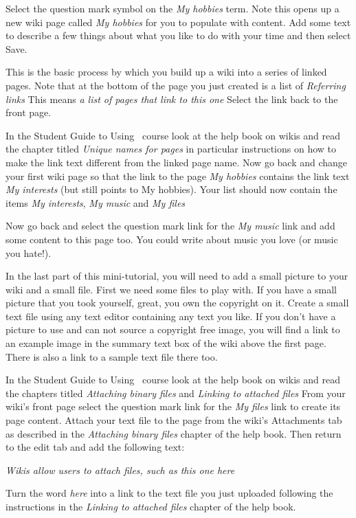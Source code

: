 Select the question mark symbol on the \emph{My hobbies} term. Note this opens up a new wiki page called \emph{My hobbies} for you to populate with content. Add some text to describe a few things about what you like to do with your time and then select Save.

This is the basic process by which you build up a wiki into a series of linked pages. Note that at the bottom of the page you just created is a list of \emph{Referring links}  This means \emph{a list of pages that link to this one}  Select the link back to the front page.

In the Student Guide to Using \moodle\ course look at the help book on wikis and read the chapter titled \emph{Unique names for pages}  in particular instructions on how to make the link text different from the linked page name. Now go back and change your first wiki page so that the link to the page \emph{My hobbies} contains the link text \emph{My interests} (but still points to My hobbies). Your list should now contain the items \emph{My interests},  \emph{My music}  and \emph{My files} 

Now go back and select the question mark link for the \emph{My music} link and add some content to this page too. You could write about music you love (or music you hate!).

In the last part of this mini-tutorial, you will need to add a small picture to your wiki and a small file. First we need some files to play with. If you have a small picture that you took yourself, great, you own the copyright on it. Create a small text file using any text editor containing any text you like. If you don't have a picture to use and can not source a copyright free image, you will find a link to an example image in the summary text box of the wiki above the first page. There is also a link to a sample text file there too.

In the Student Guide to Using \moodle\ course look at the help book on wikis and read the chapters titled \emph{Attaching binary files} and \emph{Linking to attached files}  From your wiki's front page select the question mark link for the \emph{My files} link to create its page content. Attach your text file to the page from the wiki's Attachments tab as described in the \emph{Attaching binary files} chapter of the help book. Then return to the edit tab and add the following text:

\emph{Wikis allow users to attach files, such as this one here}  

Turn the word \emph{here} into a link to the text file you just uploaded following the instructions in the \emph{Linking to attached files} chapter of the help book.

